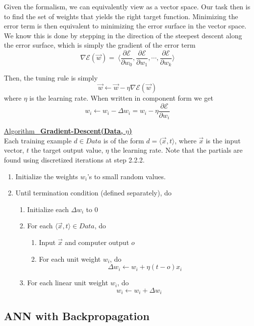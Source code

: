 \documentclass[12pt]{article}  %
\newcommand{\algtitle}[1]{\underline{Algorithm \ {\bf #1}} \vspace*{1mm}\\}
\begin{document}
Given the formalism, we can equivalently view as a vector space. Our task then is to find the set of weights that yields the right target function. Minimizing the error term is then equivalent to minimizing the error surface in the vector space. We know this is done by stepping in the direction of the steepest descent along the error surface, which is simply the gradient of the error term $$\nabla \mathcal{E}(\vec{w}) =\ \langle  \frac{\partial \mathcal{E}}{\partial w_0}, \frac{\partial \mathcal{E}}{\partial w_1}, \cdots, \frac{\partial \mathcal{E}}{\partial w_k}  \rangle$$

Then, the tuning rule is simply $$\vec{w} \leftarrow \vec{w} - \eta \nabla \mathcal{E}(\vec{w})$$ where $\eta$ is the learning rate. When written in component form we get $$w_i \leftarrow w_i - \Delta w_i = w_i - \eta \frac{\partial \mathcal{E}}{\partial w_i}$$


\algtitle{Gradient-Descent(Data, $\eta$)}
Each training example $d \in Data$ is of the form $d = \langle \vec{x}, t \rangle$, where $\vec{x}$ is the input vector, $t$ the target output value, $\eta$ the learning rate. Note that the partials are found using discretized iterations at step 2.2.2.

\begin{enumerate}
	\item Initialize the weights $w_i$'s to small random values.
	\item Until termination condition (defined separately), do
		\begin{enumerate}
			\item Initialize each $\Delta w_i$ to 0
			\item For each $\langle \vec{x}, t \rangle \in Data$, do 
			\begin{enumerate}
				\item Input $\vec{x}$ and computer output $o$
				\item For each unit weight $w_i$, do $$\Delta w_i \leftarrow w_i + \eta(t-o)x_i$$
			\end{enumerate}
			\item For each linear unit weight $w_i$, do $$w_i \leftarrow w_i + \Delta w_i$$
		\end{enumerate}
\end{enumerate}





\subsection{ANN with Backpropagation}
\end{document}
